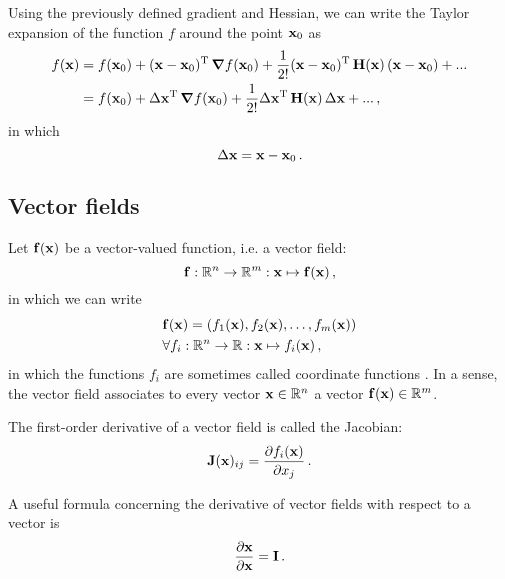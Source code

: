         Using the previously defined gradient and Hessian, we can write the Taylor expansion of the function $f$ around the point $\vb{x}_0$ as
        \begin{align}
            f(\vb{x}) &= f(\vb{x}_0) + (\vb{x} - \vb{x}_0)^\text{T} \thinspace \grad{f(\vb{x}_0)} + \frac{1}{2!} (\vb{x} - \vb{x}_0)^\text{T} \thinspace \vb{H}(\vb{x}) \thinspace (\vb{x} - \vb{x}_0) + ... \\
            &= f(\vb{x}_0) + \Delta \vb{x}^\text{T} \thinspace \grad{f(\vb{x}_0)} + \frac{1}{2!} \Delta \vb{x}^\text{T} \thinspace \vb{H}(\vb{x}) \thinspace \Delta \vb{x} + ... \thinspace ,
        \end{align}
        in which
        \begin{equation}
            \Delta \vb{x} = \vb{x} - \vb{x}_0 \thinspace .
        \end{equation}

    \subsection{Vector fields}
        Let $\vb{f}(\vb{x})$ be a vector-valued function, i.e. a vector field:
        \begin{equation}
            \vb{f}: \mathbb{R}^n \rightarrow \mathbb{R}^m: \vb{x} \mapsto \vb{f}(\vb{x}) \thinspace ,
        \end{equation}
        in which we can write
        \begin{align} \label{eq:vector_field}
            &\vb{f}(\vb{x}) = (f_1(\vb{x}), f_2(\vb{x}), \dots, f_m(\vb{x})) \\
            &\forall f_i: \mathbb{R}^n \rightarrow \mathbb{R}: \vb{x} \mapsto f_i(\vb{x}) \thinspace ,
        \end{align}
        in which the functions $f_i$ are sometimes called coordinate functions \cite{burden2010}. In a sense, the vector field associates to every vector $\vb{x} \in \mathbb{R}^n$ a vector $\vb{f}(\vb{x}) \in \mathbb{R}^m$.

        The first-order derivative of a vector field is called the Jacobian:
        \begin{equation} \label{eq:jacobian}
            \vb{J}(\vb{x})_{ij} = \pdv{f_i(\vb{x})}{x_j} \thinspace .
        \end{equation}

        A useful formula concerning the derivative of vector fields with respect to a vector is
        \begin{align}
            \pdv{\vb{x}}{\vb{x}} = \vb{I} \thinspace .
        \end{align}
